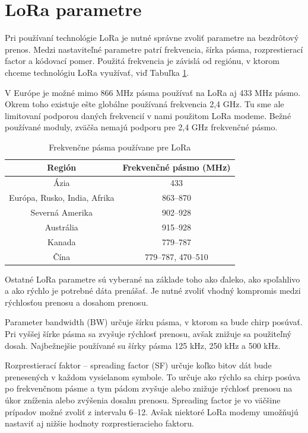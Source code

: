 \documentclass[slovak,master]{diploma}
\begin{document}
\newpage
\section{LoRa parametre}
Pri používaní technológie LoRa je nutné správne zvoliť parametre na bezdrôtový prenos. Medzi nastaviteľné parametre patrí frekvencia, šírka pásma, rozprestierací factor a kódovací pomer.
Použitá frekvencia je závislá od regiónu, v ktorom chceme technológiu LoRa využívať, viď Tabuľka \ref{tab:ismBands}. 

V Európe je možné mimo 866 MHz pásma používať na LoRa aj 433 MHz pásmo. Okrem toho existuje ešte globálne používaná frekvencia 2,4 GHz. Tu sme ale limitovaní 
podporou daných frekvencií v nami použitom LoRa modeme. Bežné používané moduly, zväčša nemajú podporu pre 2,4 GHz frekvenčné pásmo.

\begin{table}[h!]
	\centering
  \small
  \setlength\tabcolsep{6pt}
	\caption[Frekvenčne pásma používane pre LoRa]{Frekvenčne pásma používane pre LoRa}
  \begin{tabular}{c|c}
    \toprule
    Región & Frekvenčné pásmo (MHz)\\
    \midrule
    Ázia & 433 \\
    Európa, Rusko, India, Afrika & 863--870 \\
    Severná Amerika & 902--928 \\
    Austrália & 915--928 \\
    Kanada & 779--787 \\
    Čína & 779--787, 470--510 \\
    \midrule
  \end{tabular}
  \label{tab:ismBands}
\end{table}
\newpage

Ostatné LoRa parametre sú vyberané na základe toho ako ďaleko, ako spoľahlivo a ako rýchlo je potrebné dáta prenášať. Je nutné zvoliť vhodný kompromis medzi rýchlosťou prenosu 
a dosahom prenosu.

Parameter bandwidth (BW) určuje šírku pásma, v ktorom sa bude chirp posúvať. Pri vyššej šírke pásma sa zvyšuje rýchlosť prenosu, avšak znižuje sa použiteľný dosah.
Najbežnejšie používané su šírky pásma 125 kHz, 250 kHz a 500 kHz.

Rozprestierací faktor -- spreading factor (SF) určuje koľko bitov dát bude prenesených v každom vysielanom symbole. To určuje ako rýchlo sa chirp posúva po frekvenčnom pásme a tym pádom 
zvyšuje alebo znižuje rýchlosť prenosu na úkor zníženia alebo zvýšenia dosahu prenosu. Spreading factor je vo väčšine prípadov možné zvoliť z intervalu 6--12. 
Avšak niektoré LoRa modemy umožňujú nastaviť aj nižšie hodnoty rozprestieracieho faktoru. 
\end{document}
